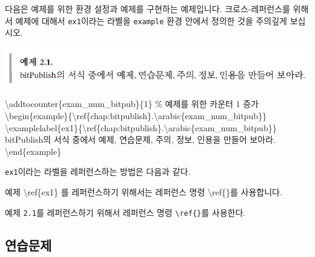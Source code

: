 \documentclass[
  letterpaper,
]{book}
\newenvironment{Shaded}{\begin{snugshade}}{\end{snugshade}}
\newcommand{\CommentTok}[1]{\textcolor[rgb]{0.37,0.37,0.37}{#1}}
\newcommand{\ExtensionTok}[1]{\textcolor[rgb]{0.00,0.23,0.31}{#1}}
\newcommand{\FunctionTok}[1]{\textcolor[rgb]{0.28,0.35,0.67}{#1}}
\newcommand{\KeywordTok}[1]{\textcolor[rgb]{0.00,0.23,0.31}{#1}}
\newcommand{\NormalTok}[1]{\textcolor[rgb]{0.00,0.23,0.31}{#1}}
\begin{document}
다음은 예제를 위한 환경 설정과 예제를 구현하는 예제입니다.
크로스-레퍼런스를 위해서 예제에 대해서 \texttt{ex1}이라는 라벨을
\texttt{example} 환경 안에서 정의한 것을 주의깊게 보십시오.

\includegraphics{images/example.jpg}

\begin{Shaded}
\begin{Highlighting}[]
\FunctionTok{\textbackslash{}addtocounter}\NormalTok{\{exam\_num\_bitpub\}\{1\}          }\CommentTok{\% 예제를 위한 카운터 1 증가}
\KeywordTok{\textbackslash{}begin}\NormalTok{\{}\ExtensionTok{example}\NormalTok{\}\{}\KeywordTok{\textbackslash{}ref}\NormalTok{\{}\ExtensionTok{chap:bitpublish}\NormalTok{\}.}\FunctionTok{\textbackslash{}arabic}\NormalTok{\{exam\_num\_bitpub\}\}}
\FunctionTok{\textbackslash{}examplelabel}\NormalTok{\{ex1\}\{}\KeywordTok{\textbackslash{}ref}\NormalTok{\{}\ExtensionTok{chap:bitpublish}\NormalTok{\}.}\FunctionTok{\textbackslash{}arabic}\NormalTok{\{exam\_num\_bitpub\}\}}
\NormalTok{bitPublish의 서식 중에서 예제, 연습문제, 주의, 정보, 인용을 만들어 보아라.}
\KeywordTok{\textbackslash{}end}\NormalTok{\{}\ExtensionTok{example}\NormalTok{\}}
\end{Highlighting}
\end{Shaded}

\texttt{ex1}이라는 라벨을 레퍼런스하는 방법은 다음과 같다.

\begin{Shaded}
\begin{Highlighting}[]
\NormalTok{예제 }\KeywordTok{\textbackslash{}ref}\NormalTok{\{}\ExtensionTok{ex1}\NormalTok{\} 를 레퍼런스하기 위해서는 레퍼런스 명령 \textasciigrave{}}\FunctionTok{\textbackslash{}ref}\NormalTok{\{\}\textasciigrave{}를 사용합니다.}
\end{Highlighting}
\end{Shaded}

예제 \texttt{2.1}를 레퍼런스하기 위해서 레퍼런스 명령
\texttt{\textbackslash{}ref\{\}}를 사용한다.

\hypertarget{uxc5f0uxc2b5uxbb38uxc81c}{%
\subsection{연습문제}\label{uxc5f0uxc2b5uxbb38uxc81c}}
\end{document}
